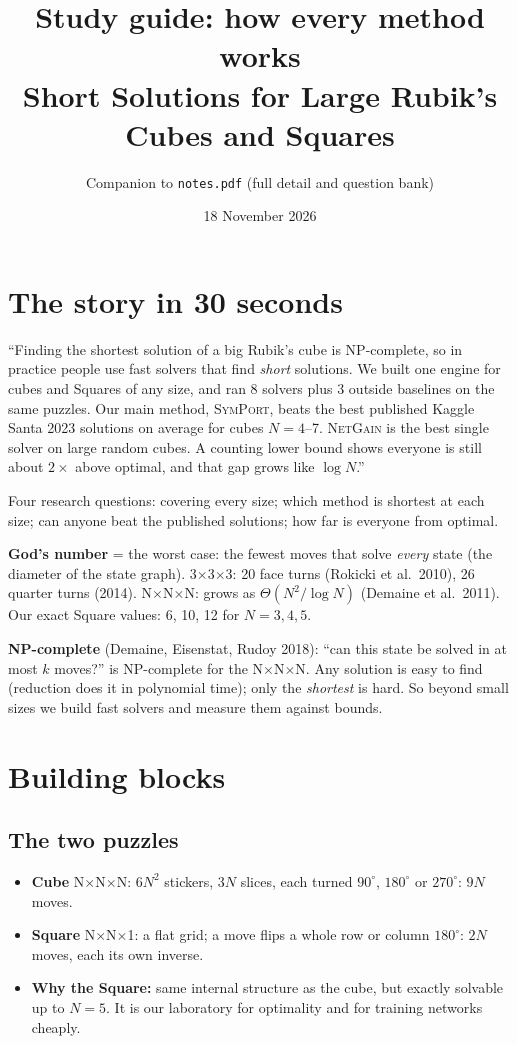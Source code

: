 \documentclass[10.5pt,a4paper]{article}
\title{\textbf{Study guide: how every method works}\\[2pt]\large Short Solutions for Large Rubik's Cubes and Squares}
\author{Companion to \texttt{notes.pdf} (full detail and question bank)}
\date{18 November 2026}
\newcommand{\Cu}[1]{#1$\times$#1$\times$#1}
\newcommand{\Sq}[1]{#1$\times$#1$\times$1}
\newcommand{\M}[1]{\textsc{#1}}
\begin{document}
\maketitle
\tableofcontents

\section{The story in 30 seconds}
\begin{keybox}
``Finding the shortest solution of a big Rubik's cube is NP-complete, so in practice people use fast solvers that find
\emph{short} solutions. We built one engine for cubes and Squares of any size, and ran 8 solvers plus 3 outside baselines on
the same puzzles. Our main method, \M{SymPort}, beats the best published Kaggle Santa 2023 solutions on average for cubes
$N=4$--7. \M{NetGain} is the best single solver on large random cubes. A counting lower bound shows everyone is still about
$2\times$ above optimal, and that gap grows like $\log N$.''
\end{keybox}
Four research questions: covering every size; which method is shortest at each size; can anyone beat the published
solutions; how far is everyone from optimal.

\textbf{God's number} = the worst case: the fewest moves that solve \emph{every} state (the diameter of the state graph).
\Cu{3}: 20 face turns (Rokicki et al.\ 2010), 26 quarter turns (2014). \Cu{N}: grows as $\Theta(N^2/\log N)$ (Demaine et
al.\ 2011). Our exact Square values: 6, 10, 12 for $N=3,4,5$.

\textbf{NP-complete} (Demaine, Eisenstat, Rudoy 2018): ``can this state be solved in at most $k$ moves?'' is NP-complete
for the \Cu{N}. Any solution is easy to find (reduction does it in polynomial time); only the \emph{shortest} is hard.
So beyond small sizes we build fast solvers and measure them against bounds.

\section{Building blocks}
\subsection{The two puzzles}
\begin{itemize}
\item \textbf{Cube} \Cu{N}: $6N^2$ stickers, $3N$ slices, each turned $90^\circ$, $180^\circ$ or $270^\circ$: $9N$ moves.
\item \textbf{Square} \Sq{N}: a flat grid; a move flips a whole row or column $180^\circ$: $2N$ moves, each its own inverse.
\item \textbf{Why the Square:} same internal structure as the cube, but exactly solvable up to $N=5$. It is our laboratory for
optimality and for training networks cheaply.
\end{itemize}
\end{document}
